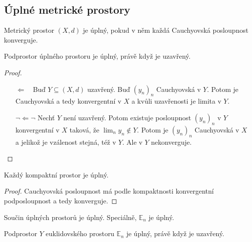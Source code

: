 \documentclass[../main.tex]{subfiles}
\begin{document}
\subsection{Úplné metrické prostory}

\begin{definition}
	Metrický prostor $(X,d)$ je úplný, pokud v něm každá Cauchyovská posloupnost konverguje.
\end{definition}

\begin{lemma}
	Podprostor úplného prostoru je úplný, právě když je uzavřený.
\end{lemma}

\begin{proof}
	\begin{enumerate}
		\item[$\Leftarrow \phantom{\lnot} $] Buď $Y \subseteq (X,d)$ uzavřený. Buď $(y_n)_n$ Cauchyovská v $Y$. Potom je Cauchyovská 
	    a tedy konvergentní v $X$ a kvůli uzavřenosti je limita v $Y$.
	    \item[$\lnot \Leftarrow \lnot $] Nechť $Y$ není uzavřený. Potom existuje posloupnost $(y_n)_n$ v $Y$ konvergentní v $X$ taková, že $\lim_n y_n \notin Y$.
	    Potom je $(y_n)_n$ Cauchyovská v $X$ a jelikož je vzálenost stejná, též v $Y$. Ale v $Y$ nekonverguje.
	\end{enumerate}
\end{proof}

\begin{lemma}
	Každý kompaktní prostor je úplný.
\end{lemma}

\begin{proof}
	Cauchyovská posloupnost má podle kompaktnosti konvergentní podposloupnost a tedy konverguje.
\end{proof}

\begin{theorem}
	Součin úplných prostorů je úplný. Speciálně, $\mathbb{E}_n$ je úplný.
\end{theorem}

\begin{consequence}
	Podprostor $Y$ euklidovského prostoru $\mathbb{E}_n$ je úplný, právě když je uzavřený.
\end{consequence}
\end{document}
